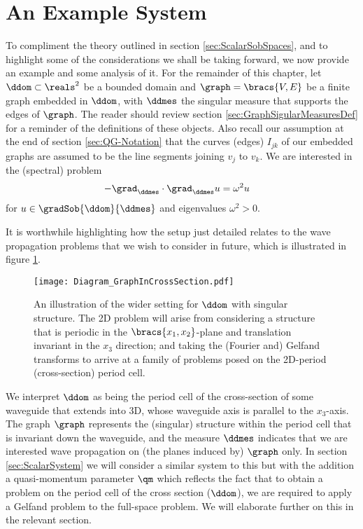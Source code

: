 \section{An Example System} \label{sec:ScalarExample}
To compliment the theory outlined in section \ref{sec:ScalarSobSpaces}, and to highlight some of the considerations we shall be taking forward, we now provide an example and some analysis of it.
For the remainder of this chapter, let $\ddom\subset\reals^2$ be a bounded domain and $\graph = \bracs{V,E}$ be a finite graph embedded in $\ddom$, with $\ddmes$ the singular measure that supports the edges of $\graph$.
The reader should review section \ref{sec:GraphSigularMeasuresDef} for a reminder of the definitions of these objects.
Also recall our assumption at the end of section \ref{sec:QG-Notation} that the curves (edges) $I_{jk}$ of our embedded graphs are assumed to be the line segments joining $v_j$ to $v_k$.
We are interested in the (spectral) problem
\begin{align} \label{eq:ScalarExampleStrongForm}
	-\grad_\ddmes \cdot \grad_\ddmes u &= \omega^2 u
\end{align}
for $u\in\gradSob{\ddom}{\ddmes}$ and eigenvalues $\omega^2>0$. \newline

It is worthwhile highlighting how the setup just detailed relates to the wave propagation problems that we wish to consider in future, which is illustrated in figure \ref{fig:ScalarStrucDiagram}.
\begin{figure}[b!]
	\centering
	\texttt{[image: Diagram\_GraphInCrossSection.pdf]}
	\caption{\label{fig:ScalarStrucDiagram} An illustration of the wider setting for $\ddom$ with singular structure. The 2D problem will arise from considering a structure that is periodic in the $\bracs{x_1,x_2}$-plane and translation invariant in the $x_3$ direction; and taking the (Fourier and) Gelfand transforms to arrive at a family of problems posed on the 2D-period (cross-section) period cell.}
\end{figure}
We interpret $\ddom$ as being the period cell of the cross-section of some waveguide that extends into 3D, whose waveguide axis is parallel to the $x_3$-axis.
The graph $\graph$ represents the (singular) structure within the period cell that is invariant down the waveguide, and the measure $\ddmes$ indicates that we are interested wave propagation on (the planes induced by) $\graph$ only.
In section \ref{sec:ScalarSystem} we will consider a similar system to this but with the addition a quasi-momentum parameter $\qm$ which reflects the fact that to obtain a problem on the period cell of the cross section ($\ddom$), we are required to apply a Gelfand problem to the full-space problem.
We will elaborate further on this in the relevant section. \newline

